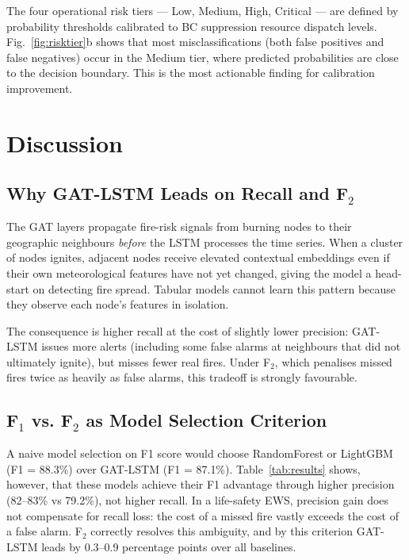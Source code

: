 \documentclass[conference]{IEEEtran}
\begin{document}
The four operational risk tiers — Low, Medium, High, Critical — are
defined by probability thresholds calibrated to BC suppression
resource dispatch levels. Fig.~\ref{fig:risktier}b shows that most
misclassifications (both false positives and false negatives) occur
in the Medium tier, where predicted probabilities are close to the
decision boundary. This is the most actionable finding for calibration
improvement.

\section{Discussion}
\label{sec:discussion}

\subsection{Why GAT-LSTM Leads on Recall and F$_2$}

The GAT layers propagate fire-risk signals from burning nodes to their
geographic neighbours \emph{before} the LSTM processes the time series.
When a cluster of nodes ignites, adjacent nodes receive elevated
contextual embeddings even if their own meteorological features have not
yet changed, giving the model a head-start on detecting fire spread.
Tabular models cannot learn this pattern because they observe each node's
features in isolation.

The consequence is higher recall at the cost of slightly lower precision:
GAT-LSTM issues more alerts (including some false alarms at neighbours
that did not ultimately ignite), but misses fewer real fires. Under
F$_2$, which penalises missed fires twice as heavily as false alarms,
this tradeoff is strongly favourable.

\subsection{F$_1$ vs. F$_2$ as Model Selection Criterion}

A naive model selection on F1 score would choose RandomForest or
LightGBM (F1 = 88.3\%) over GAT-LSTM (F1 = 87.1\%). Table~\ref{tab:results}
shows, however, that these models achieve their F1 advantage through
higher precision (82–83\% vs 79.2\%), not higher recall. In a life-safety
EWS, precision gain does not compensate for recall loss: the cost of a
missed fire vastly exceeds the cost of a false alarm. F$_2$ correctly
resolves this ambiguity, and by this criterion GAT-LSTM leads by 0.3–0.9
percentage points over all baselines.
\end{document}
